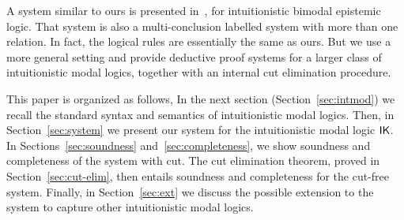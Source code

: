 A system similar to ours is presented
in~\cite{maffezioli:etal:synthese13}, for intuitionistic bimodal
epistemic logic. That system is also a multi-conclusion labelled system with
more than one relation. In fact, the logical rules are essentially the
same as ours. But we use a more general setting and provide deductive proof
systems for a larger class of intuitionistic modal logics, together
with an internal cut elimination procedure.


This paper is organized as follows, In the next section (Section~\ref{sec:intmod}) we recall the standard syntax and semantics of intuitionistic modal logics. Then, in Section~\ref{sec:system} we present our system for the intuitionistic modal logic $\mathsf{IK}$. In Sections~\ref{sec:soundness} and~\ref{sec:completeness}, we show soundness and completeness of the system with cut. The cut elimination theorem, proved in Section~\ref{sec:cut-elim}, then entails soundness and completeness for the cut-free system. Finally, in Section~\ref{sec:ext} we discuss the possible extension to the system to capture other intuitionistic modal logics.



